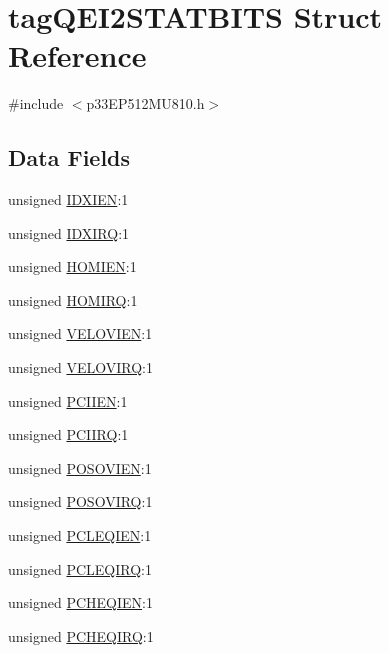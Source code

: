 \hypertarget{structtag_q_e_i2_s_t_a_t_b_i_t_s}{}\section{tag\+Q\+E\+I2\+S\+T\+A\+T\+B\+I\+TS Struct Reference}
\label{structtag_q_e_i2_s_t_a_t_b_i_t_s}


{\ttfamily \#include $<$p33\+E\+P512\+M\+U810.\+h$>$}

\subsection*{Data Fields}
\begin{DoxyCompactItemize}
\item 
unsigned \hyperlink{structtag_q_e_i2_s_t_a_t_b_i_t_s_ae75a0f9636a86752c0936129346743c3}{I\+D\+X\+I\+EN}\+:1
\item 
unsigned \hyperlink{structtag_q_e_i2_s_t_a_t_b_i_t_s_a6841efdcfe08b769fa40ce03ab1f08e7}{I\+D\+X\+I\+RQ}\+:1
\item 
unsigned \hyperlink{structtag_q_e_i2_s_t_a_t_b_i_t_s_a9b76df246fc22bd8a69d0bfc50ceddf9}{H\+O\+M\+I\+EN}\+:1
\item 
unsigned \hyperlink{structtag_q_e_i2_s_t_a_t_b_i_t_s_a4921e69bb8feedfbe162929108ac26c2}{H\+O\+M\+I\+RQ}\+:1
\item 
unsigned \hyperlink{structtag_q_e_i2_s_t_a_t_b_i_t_s_ae01860f2dc36a69ff1e81ce65661c28d}{V\+E\+L\+O\+V\+I\+EN}\+:1
\item 
unsigned \hyperlink{structtag_q_e_i2_s_t_a_t_b_i_t_s_ad75eda4eefa6358d4d1d03b82b30ce9c}{V\+E\+L\+O\+V\+I\+RQ}\+:1
\item 
unsigned \hyperlink{structtag_q_e_i2_s_t_a_t_b_i_t_s_a2ef6222fd1249228332feebae5381efd}{P\+C\+I\+I\+EN}\+:1
\item 
unsigned \hyperlink{structtag_q_e_i2_s_t_a_t_b_i_t_s_a3b364ff02d04c6f4722f62d09326c81d}{P\+C\+I\+I\+RQ}\+:1
\item 
unsigned \hyperlink{structtag_q_e_i2_s_t_a_t_b_i_t_s_adab3f48113ee0fb91e55573891da844b}{P\+O\+S\+O\+V\+I\+EN}\+:1
\item 
unsigned \hyperlink{structtag_q_e_i2_s_t_a_t_b_i_t_s_a00c5d80daf45593bbc35f3a07e1410c0}{P\+O\+S\+O\+V\+I\+RQ}\+:1
\item 
unsigned \hyperlink{structtag_q_e_i2_s_t_a_t_b_i_t_s_a827dd6a06be3aab016be425b720f3353}{P\+C\+L\+E\+Q\+I\+EN}\+:1
\item 
unsigned \hyperlink{structtag_q_e_i2_s_t_a_t_b_i_t_s_affd3f46352586784f86b3f7723360d2f}{P\+C\+L\+E\+Q\+I\+RQ}\+:1
\item 
unsigned \hyperlink{structtag_q_e_i2_s_t_a_t_b_i_t_s_aec419f32b912394dfde6e45a8569382f}{P\+C\+H\+E\+Q\+I\+EN}\+:1
\item 
unsigned \hyperlink{structtag_q_e_i2_s_t_a_t_b_i_t_s_a81eff3120ba837852e42c44dd693b774}{P\+C\+H\+E\+Q\+I\+RQ}\+:1
\end{DoxyCompactItemize}


